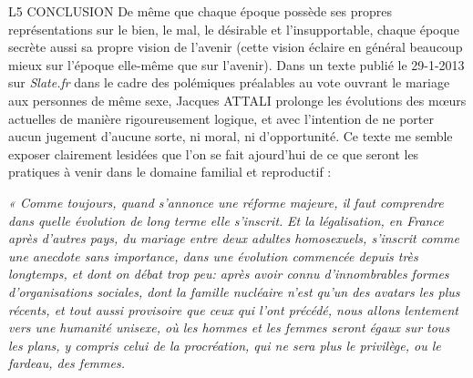L5 CONCLUSION
 De même que chaque époque possède ses propres représentations sur le bien, le mal, le désirable et l'insupportable, chaque époque secrète aussi sa propre vision de l'avenir (cette vision éclaire en général beaucoup mieux sur l'époque elle-même que sur l'avenir). Dans un texte publié le 29-1-2013 sur \emph{Slate.fr} dans le cadre des polémiques préalables au vote ouvrant le mariage aux personnes de même sexe, Jacques ATTALI prolonge les évolutions des mœurs actuelles de manière rigoureusement logique, et avec l'intention de ne porter aucun jugement d'aucune sorte, ni moral, ni d'opportunité. Ce texte me semble exposer clairement lesidées que l'on se fait ajourd'hui de ce que seront les pratiques à venir dans le domaine familial et reproductif :
 
 \emph{« Comme toujours, quand s'annonce une réforme majeure, il faut comprendre dans quelle évolution de long terme elle s'inscrit.}
 \emph{Et la légalisation, en France après d'autres pays, du mariage entre deux adultes homosexuels, s'inscrit comme une anecdote sans importance, dans une évolution commencée depuis très longtemps, et dont on débat trop peu: après avoir connu d'innombrables formes d'organisations sociales, dont la famille nucléaire n'est qu'un des avatars les plus récents, et tout aussi provisoire que ceux qui l'ont précédé, nous allons lentement vers une humanité unisexe, où les hommes et les femmes seront égaux sur tous les plans, y compris celui de la procréation, qui ne sera plus le privilège, ou le fardeau, des femmes.} 
